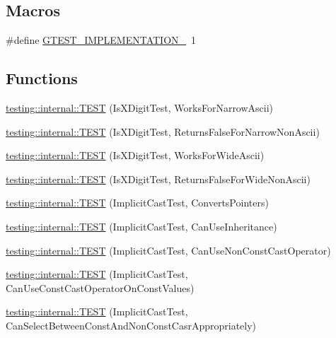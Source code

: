 \subsection*{Macros}
\begin{DoxyCompactItemize}
\item 
\#define \hyperlink{gtest-port__test_8cc_a83bd232fd1077579fada92c31bb7469f}{G\+T\+E\+S\+T\+\_\+\+I\+M\+P\+L\+E\+M\+E\+N\+T\+A\+T\+I\+O\+N\+\_\+}~1
\end{DoxyCompactItemize}
\subsection*{Functions}
\begin{DoxyCompactItemize}
\item 
\hyperlink{namespacetesting_1_1internal_a0c1e055c001e4dbb874f00a46c25bb00}{testing\+::internal\+::\+T\+E\+ST} (Is\+X\+Digit\+Test, Works\+For\+Narrow\+Ascii)
\item 
\hyperlink{namespacetesting_1_1internal_a7cd9d67d4164d2aeb4ceb3ed253c7d2d}{testing\+::internal\+::\+T\+E\+ST} (Is\+X\+Digit\+Test, Returns\+False\+For\+Narrow\+Non\+Ascii)
\item 
\hyperlink{namespacetesting_1_1internal_af76bca685fddffc0ecda1464b1b6a0a4}{testing\+::internal\+::\+T\+E\+ST} (Is\+X\+Digit\+Test, Works\+For\+Wide\+Ascii)
\item 
\hyperlink{namespacetesting_1_1internal_a771232ed3801fa49cbd4bbe11b318fe3}{testing\+::internal\+::\+T\+E\+ST} (Is\+X\+Digit\+Test, Returns\+False\+For\+Wide\+Non\+Ascii)
\item 
\hyperlink{namespacetesting_1_1internal_a5d2ec1128c80363b06070f403f682490}{testing\+::internal\+::\+T\+E\+ST} (Implicit\+Cast\+Test, Converts\+Pointers)
\item 
\hyperlink{namespacetesting_1_1internal_a1b304dcd3ac71095f2e7d9e9b43c4755}{testing\+::internal\+::\+T\+E\+ST} (Implicit\+Cast\+Test, Can\+Use\+Inheritance)
\item 
\hyperlink{namespacetesting_1_1internal_a8554484c7c0ea536bc393c254490aaff}{testing\+::internal\+::\+T\+E\+ST} (Implicit\+Cast\+Test, Can\+Use\+Non\+Const\+Cast\+Operator)
\item 
\hyperlink{namespacetesting_1_1internal_af7f631f9fbde27b19a65d50fc29e1420}{testing\+::internal\+::\+T\+E\+ST} (Implicit\+Cast\+Test, Can\+Use\+Const\+Cast\+Operator\+On\+Const\+Values)
\item 
\hyperlink{namespacetesting_1_1internal_a62a3b62658f9d47733cb7b5c8f69b2ad}{testing\+::internal\+::\+T\+E\+ST} (Implicit\+Cast\+Test, Can\+Select\+Between\+Const\+And\+Non\+Const\+Casr\+Appropriately)

\end{DoxyCompactItemize}
